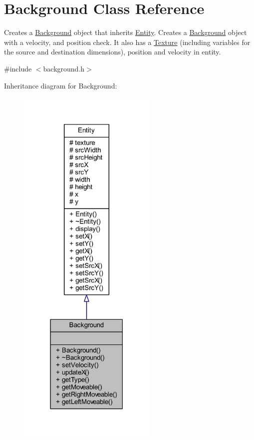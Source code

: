 \hypertarget{class_background}{\section{Background Class Reference}
\label{class_background}
}


Creates a \hyperlink{class_background}{Background} object that inherits \hyperlink{class_entity}{Entity}. Creates a \hyperlink{class_background}{Background} object with a velocity, and position check. It also has a \hyperlink{class_texture}{Texture} (including variables for the source and destination dimensions), position and velocity in entity.  




{\ttfamily \#include $<$background.\+h$>$}



Inheritance diagram for Background\+:
\nopagebreak
\begin{figure}[H]
\begin{center}
\leavevmode
\includegraphics[width=188pt]{class_background__inherit__graph}
\end{center}
\end{figure}


